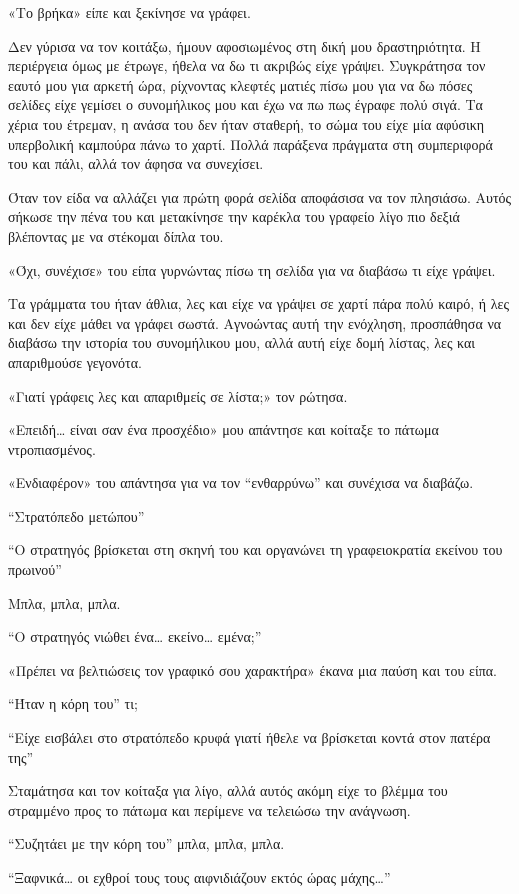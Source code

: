 \documentclass[12pt,twoside, openany]{book}
\begin{document}
«Το βρήκα» είπε και ξεκίνησε να γράφει.

Δεν γύρισα να τον κοιτάξω, ήμουν αφοσιωμένος στη δική μου δραστηριότητα. Η περιέργεια όμως με έτρωγε, ήθελα να δω τι ακριβώς είχε γράψει. Συγκράτησα τον εαυτό μου για αρκετή ώρα, ρίχνοντας κλεφτές ματιές πίσω μου για να δω πόσες σελίδες είχε γεμίσει ο συνομήλικος μου και έχω να πω πως έγραφε πολύ σιγά. Τα χέρια του έτρεμαν, η ανάσα του δεν ήταν σταθερή, το σώμα του είχε μία αφύσικη υπερβολική καμπούρα πάνω το χαρτί. Πολλά παράξενα πράγματα στη συμπεριφορά του και πάλι, αλλά τον άφησα να συνεχίσει.

Όταν τον είδα να αλλάζει για πρώτη φορά σελίδα αποφάσισα να τον πλησιάσω. Αυτός σήκωσε την πένα του και μετακίνησε την καρέκλα του γραφείο λίγο πιο δεξιά βλέποντας με να στέκομαι δίπλα του.

«Όχι, συνέχισε» του είπα γυρνώντας πίσω τη σελίδα για να διαβάσω τι είχε γράψει.

Τα γράμματα του ήταν άθλια, λες και είχε να γράψει σε χαρτί πάρα πολύ καιρό, ή λες και δεν είχε μάθει να γράφει σωστά. Αγνοώντας αυτή την ενόχληση, προσπάθησα να διαβάσω την ιστορία του συνομήλικου μου, αλλά αυτή είχε δομή λίστας, λες και απαριθμούσε γεγονότα.

«Γιατί γράφεις λες και απαριθμείς σε λίστα;» τον ρώτησα.

«Επειδή… είναι σαν ένα προσχέδιο» μου απάντησε και κοίταξε το πάτωμα ντροπιασμένος.

«Ενδιαφέρον» του απάντησα για να τον “ενθαρρύνω” και συνέχισα να διαβάζω.

“Στρατόπεδο μετώπου”

“Ο στρατηγός βρίσκεται στη σκηνή του και οργανώνει τη γραφειοκρατία εκείνου του πρωινού”

Μπλα, μπλα, μπλα.

“Ο στρατηγός νιώθει ένα… εκείνο… εμένα;”

«Πρέπει να βελτιώσεις τον γραφικό σου χαρακτήρα» έκανα μια παύση και του είπα.

“Ήταν η κόρη του” τι;

“Είχε εισβάλει στο στρατόπεδο κρυφά γιατί ήθελε να βρίσκεται κοντά στον πατέρα της”

Σταμάτησα και τον κοίταξα για λίγο, αλλά αυτός ακόμη είχε το βλέμμα του στραμμένο προς το πάτωμα και περίμενε να τελειώσω την ανάγνωση.

“Συζητάει με την κόρη του” μπλα, μπλα, μπλα.

“Ξαφνικά… οι εχθροί τους τους αιφνιδιάζουν εκτός ώρας μάχης…”
\end{document}
